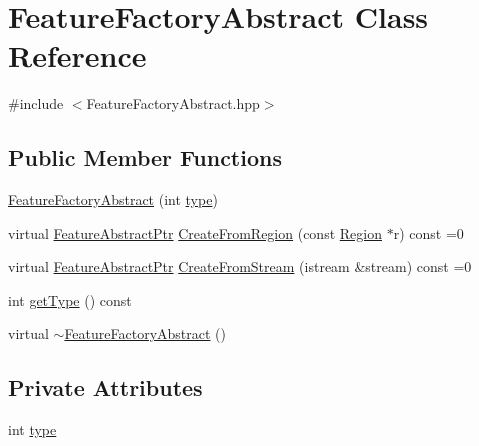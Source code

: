 \hypertarget{class_feature_factory_abstract}{\section{Feature\+Factory\+Abstract Class Reference}
\label{class_feature_factory_abstract}
}


{\ttfamily \#include $<$Feature\+Factory\+Abstract.\+hpp$>$}

\subsection*{Public Member Functions}
\begin{DoxyCompactItemize}
\item 
\hyperlink{class_feature_factory_abstract_ad4b115dcdef61da4220ddfeef13f098f}{Feature\+Factory\+Abstract} (int \hyperlink{class_feature_factory_abstract_acdc4ca5ce9d35423f420c53081f0f238}{type})
\item 
virtual \hyperlink{class_feature_abstract_ptr}{Feature\+Abstract\+Ptr} \hyperlink{class_feature_factory_abstract_a2b1aca909574b1828c8b019056656036}{Create\+From\+Region} (const \hyperlink{class_region}{Region} $\ast$r) const =0
\item 
virtual \hyperlink{class_feature_abstract_ptr}{Feature\+Abstract\+Ptr} \hyperlink{class_feature_factory_abstract_a32e7b404d34169840dae5ff1839da705}{Create\+From\+Stream} (istream \&stream) const =0
\item 
int \hyperlink{class_feature_factory_abstract_ab8d13b663824c6e49c8d195344b934a3}{get\+Type} () const 
\item 
virtual \hyperlink{class_feature_factory_abstract_af219e0ee978f0d7bf87761471a1ff96d}{$\sim$\+Feature\+Factory\+Abstract} ()
\end{DoxyCompactItemize}
\subsection*{Private Attributes}
\begin{DoxyCompactItemize}
\item 
int \hyperlink{class_feature_factory_abstract_acdc4ca5ce9d35423f420c53081f0f238}{type}
\end{DoxyCompactItemize}


